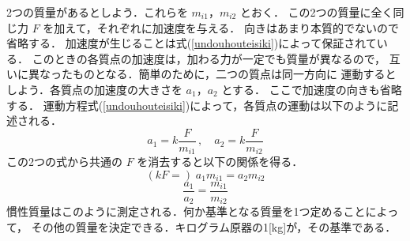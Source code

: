                 2つの質量があるとしよう．これらを $m_{i1}$，$m_{i2}$ とおく．
                この2つの質量に全く同じ力 $F$ を加えて，それぞれに加速度を与える．
                向きはあまり本質的でないので省略する．
                加速度が生じることは式(\ref{undouhouteisiki})によって保証されている．
                このときの各質点の加速度は，加わる力が一定でも質量が異なるので，
                互いに異なったものとなる．簡単のために，二つの質点は同一方向に
                運動するとしよう．各質点の加速度の大きさを $a_{1}$，$a_{2}$ とする．
                ここで加速度の向きも省略する．
                運動方程式(\ref{undouhouteisiki})によって，各質点の運動は以下のように記述される．
                    \begin{equation*}
                        a_{1}=k\frac{F}{m_{i1}}\,,\quad a_{2}=k\frac{F}{m_{i2}}
                    \end{equation*}
                この2つの式から共通の $F$ を消去すると以下の関係を得る．
                    \begin{equation*}
                        (kF=)\;a_{1}m_{i1}=a_{2}m_{i2}
                    \end{equation*}
                    \begin{equation*}
                        \frac{a_{1}}{a_{2}}=\frac{m_{i1}}{m_{i2}}
                    \end{equation*}
                慣性質量はこのように測定される．何か基準となる質量を1つ定めることによって，
                その他の質量を決定できる．キログラム原器の1[kg]が，その基準である．

